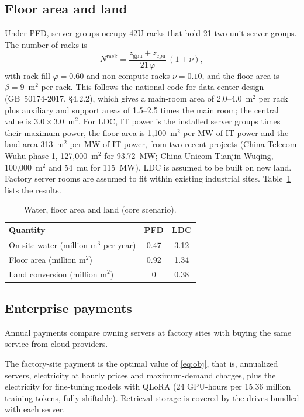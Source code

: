 \documentclass[11pt]{article}
\begin{document}
\subsection*{Floor area and land}
Under PFD, server groups occupy 42U racks that hold 21 two-unit server groups. The number of racks is
\begin{equation}
N^{\mathrm{rack}}=\frac{z_{\mathrm{gpu}}+z_{\mathrm{cpu}}}{21\,\varphi}\,(1+\nu),\label{eq:racks}
\end{equation}
with rack fill $\varphi=0.60$ and non-compute racks $\nu=0.10$, and the floor area is $\beta=9$~m$^2$ per rack. This follows the national code for data-center design (GB~50174-2017, \S4.2.2), which gives a main-room area of 2.0--4.0~m$^2$ per rack plus auxiliary and support areas of 1.5--2.5 times the main room; the central value is $3.0\times3.0$~m$^2$. For LDC, IT power is the installed server groups times their maximum power, the floor area is 1,100~m$^2$ per MW of IT power and the land area 313~m$^2$ per MW of IT power, from two recent projects (China Telecom Wuhu phase 1, 127,000~m$^2$ for 93.72~MW; China Unicom Tianjin Wuqing, 100,000~m$^2$ and 54~mu for 115~MW). LDC is assumed to be built on new land. Factory server rooms are assumed to fit within existing industrial sites. Table~\ref{tab:footprint} lists the results.

\begin{table}[H]
\centering\small
\caption{Water, floor area and land (core scenario).}\label{tab:footprint}
\begin{tabular}{@{}lcc@{}}
\toprule
Quantity & PFD & LDC \\
\midrule
On-site water (million m$^3$ per year) & 0.47 & 3.12 \\
Floor area (million m$^2$) & 0.92 & 1.34 \\
Land conversion (million m$^2$) & 0 & 0.38 \\
\bottomrule
\end{tabular}
\end{table}

\subsection*{Enterprise payments}
Annual payments compare owning servers at factory sites with buying the same service from cloud providers.

The factory-site payment is the optimal value of \eqref{eq:obj}, that is, annualized servers, electricity at hourly prices and maximum-demand charges, plus the electricity for fine-tuning models with QLoRA (24 GPU-hours per 15.36 million training tokens, fully shiftable). Retrieval storage is covered by the drives bundled with each server.
\end{document}
